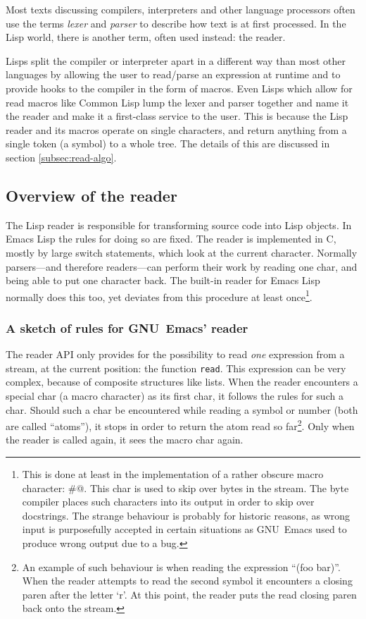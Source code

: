 \documentclass[a4paper,10pt,twoside]{article}
\newcommand{\el}{Emacs Lisp}
\newcommand{\cl}{Common Lisp}
\newcommand{\fun}[1]{\texttt{#1}}
\newcommand{\emacs}{GNU~Emacs}
\newcommand{\Read}{\fun{read}}
\begin{document}
Most texts discussing compilers, interpreters and other language processors
often use the terms \emph{lexer} and \emph{parser} to describe how text is at
first processed.  In the Lisp world, there is another term, often used instead:
the reader.

Lisps split the compiler or interpreter apart in a different way than most other
languages by allowing the user to read/parse an expression at runtime and to
provide hooks to the compiler in the form of macros.  Even Lisps which allow for
read macros like \cl{} lump the lexer and parser together and name it the reader
and make it a first-class service to the user.  This is because the Lisp reader
and its macros operate on single characters, and return anything from a single
token (a symbol) to a whole tree.  The details of this are discussed in section
\ref{subsec:read-algo}.

\subsection{Overview of the reader}
\label{subsec:reader}

The Lisp reader is responsible for transforming source code into Lisp objects.
In \el{} the rules for doing so are fixed.  The reader is implemented in C,
mostly by large switch statements, which look at the current character.
Normally parsers---and therefore readers---can perform their work by reading one
char, and being able to put one character back.  The built-in reader for \el{}
normally does this too, yet deviates from this procedure at least
once\footnote{This is done at least in the implementation of a rather obscure
  macro character: \#@.  This char is used to skip over bytes in the stream.
  The byte compiler places such characters into its output in order to skip over
  docstrings.  The strange behaviour is probably for historic reasons, as wrong
  input is purposefully accepted in certain situations as \emacs{} used to
  produce wrong output due to a bug.}.

\subsubsection{A sketch of rules for \emacs’ reader}
\label{subsubsec:rules-sketch}

The reader API only provides for the possibility to read \emph{one} expression
from a stream, at the current position: the function \Read{}.  This
expression can be very complex, because of composite structures like lists.
When the reader encounters a special char (a macro character) as its first char,
it follows the rules for such a char.  Should such a char be encountered while
reading a symbol or number (both are called ``atoms''), it stops in order to
return the atom read so far\footnote{An example of such behaviour is when
  reading the expression ``(foo bar)''.  When the reader attempts to read the
  second symbol it encounters a closing paren after the letter `r'.  At this
  point, the reader puts the read closing paren back onto the stream.}.  Only
when the reader is called again, it sees the macro char again.
\end{document}
